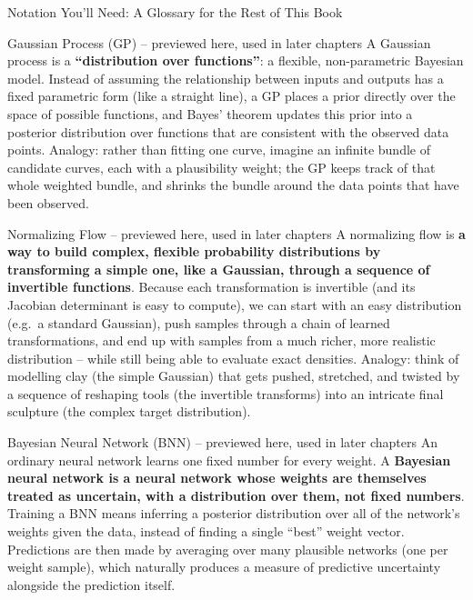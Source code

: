 \documentclass[aspectratio=169,10pt]{beamer}
\begin{document}
\begin{frame}[allowframebreaks]{Notation You'll Need: A Glossary for the Rest of This Book}
  \begin{block}{Gaussian Process (GP) -- previewed here, used in later chapters}
    A Gaussian process is a \textbf{``distribution over functions''}: a
    flexible, non-parametric Bayesian model. Instead of assuming the
    relationship between inputs and outputs has a fixed parametric form
    (like a straight line), a GP places a prior directly over the space of
    possible functions, and Bayes' theorem updates this prior into a
    posterior distribution over functions that are consistent with the
    observed data points. Analogy: rather than fitting one curve, imagine an
    infinite bundle of candidate curves, each with a plausibility weight; the
    GP keeps track of that whole weighted bundle, and shrinks the bundle
    around the data points that have been observed.
  \end{block}

  \framebreak

  \begin{block}{Normalizing Flow -- previewed here, used in later chapters}
    A normalizing flow is \textbf{a way to build complex, flexible
    probability distributions by transforming a simple one, like a
    Gaussian, through a sequence of invertible functions}. Because each
    transformation is invertible (and its Jacobian determinant is easy to
    compute), we can start with an easy distribution (e.g.\ a standard
    Gaussian), push samples through a chain of learned transformations, and
    end up with samples from a much richer, more realistic distribution --
    while still being able to evaluate exact densities. Analogy: think of
    modelling clay (the simple Gaussian) that gets pushed, stretched, and
    twisted by a sequence of reshaping tools (the invertible transforms)
    into an intricate final sculpture (the complex target distribution).
  \end{block}

  \begin{block}{Bayesian Neural Network (BNN) -- previewed here, used in later chapters}
    An ordinary neural network learns one fixed number for every weight. A
    \textbf{Bayesian neural network is a neural network whose weights are
    themselves treated as uncertain, with a distribution over them, not
    fixed numbers}. Training a BNN means inferring a posterior distribution
    over all of the network's weights given the data, instead of finding a
    single ``best'' weight vector. Predictions are then made by averaging
    over many plausible networks (one per weight sample), which naturally
    produces a measure of predictive uncertainty alongside the prediction
    itself.
  \end{block}
\end{frame}
\end{document}
